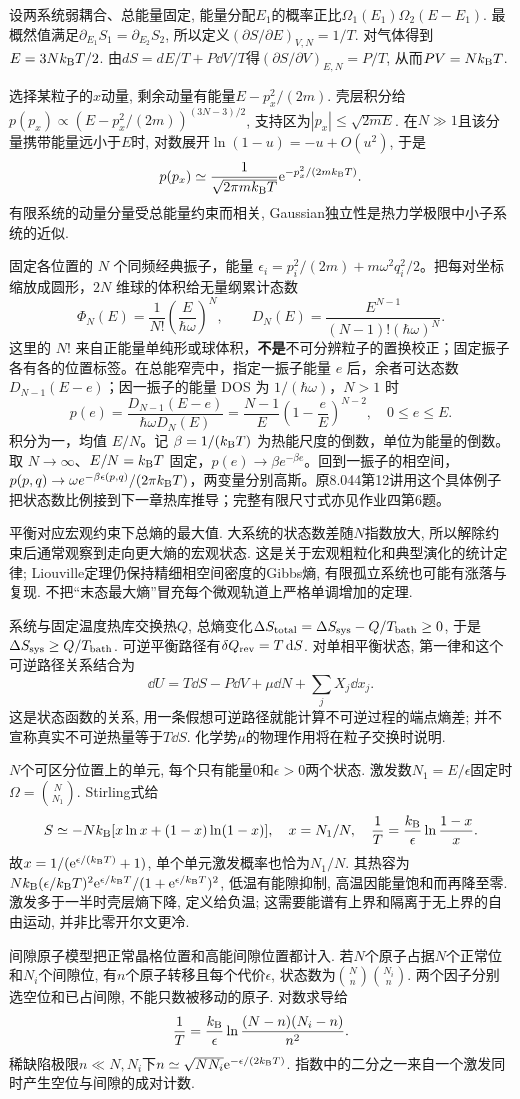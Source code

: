 设两系统弱耦合、总能量固定, 能量分配$E_1$的概率正比$\Omega_1(E_1)\Omega_2(E-E_1)$. 最概然值满足$\partial_{E_1}S_1=\partial_{E_2}S_2$, 所以定义$(\partial S/\partial E)_{V,N}=1/T$. 对气体得到$E=3Nk_{\mathrm B} T/2$. 由$dS=dE/T+P\dd V/T$得$(\partial S/\partial V)_{E,N}=P/T$, 从而$PV=Nk_{\mathrm B} T$.

选择某粒子的$x$动量, 剩余动量有能量$E-p_x^2/(2m)$. 壳层积分给$p(p_x)\propto(E-p_x^2/(2m))^{(3N-3)/2}$, 支持区为$|p_x|\le\sqrt{2mE}$. 在$N\gg1$且该分量携带能量远小于$E$时, 对数展开$\ln(1-u)=-u+O(u^2)$, 于是
\[
p(p_x)\simeq\frac1{\sqrt{2\pi mk_{\mathrm B} T}}\mathrm e^{-p_x^2/(2mk_{\mathrm B} T)}.
\]
有限系统的动量分量受总能量约束而相关, Gaussian独立性是热力学极限中小子系统的近似.

固定各位置的 $N$ 个同频经典振子，能量 $\epsilon_i=p_i^2/(2m)+m\omega^2q_i^2/2$。把每对坐标缩放成圆形，$2N$ 维球的体积给无量纲累计态数
\[\Phi_N(E)=\frac1{N!}\left(\frac E{\hbar\omega}\right)^N,\qquad D_N(E)=\frac{E^{N-1}}{(N-1)!(\hbar\omega)^N}.\]
这里的 $N!$ 来自正能量单纯形或球体积，\textbf{不是}不可分辨粒子的置换校正；固定振子各有各的位置标签。在总能窄壳中，指定一振子能量 $e$ 后，余者可达态数 $D_{N-1}(E-e)$；因一振子的能量 DOS 为 $1/(\hbar\omega)$，$N>1$ 时
\[p(e)=\frac{D_{N-1}(E-e)}{\hbar\omega D_N(E)}=\frac{N-1}E\left(1-\frac eE\right)^{N-2},\quad0\le e\le E.\]
积分为一，均值 $E/N$。记 $\beta=1/(k_{\mathrm B} T)$ 为热能尺度的倒数，单位为能量的倒数。取 $N\to\infty$、$E/N=k_{\mathrm B} T$ 固定，$p(e)\to\beta e^{-\beta e}$。回到一振子的相空间，$p(p,q)\to\omega e^{-\beta\epsilon(p,q)}/(2\pi k_{\mathrm B} T)$，两变量分别高斯。原8.044第12讲用这个具体例子把状态数比例接到下一章热库推导；完整有限尺寸式亦见作业四第6题。

平衡对应宏观约束下总熵的最大值. 大系统的状态数差随$N$指数放大, 所以解除约束后通常观察到走向更大熵的宏观状态. 这是关于宏观粗粒化和典型演化的统计定律; Liouville定理仍保持精细相空间密度的Gibbs熵, 有限孤立系统也可能有涨落与复现. 不把“末态最大熵”冒充每个微观轨道上严格单调增加的定理.

系统与固定温度热库交换热$Q$, 总熵变化$\Delta S_{\rm total}=\Delta S_{\rm sys}-Q/T_{\rm bath}\ge0$, 于是$\Delta S_{\rm sys}\ge Q/T_{\rm bath}$. 可逆平衡路径有$\delta Q_{\rm rev}=T\,\mathrm d S$. 对单相平衡状态, 第一律和这个可逆路径关系结合为
\[
\dd U=T\dd S-P\dd V+\mu\dd N+\sum_j X_j\dd x_j.
\]
这是状态函数的关系, 用一条假想可逆路径就能计算不可逆过程的端点熵差; 并不宣称真实不可逆热量等于$T\dd S$. 化学势$\mu$的物理作用将在粒子交换时说明.

$N$个可区分位置上的单元, 每个只有能量0和$\epsilon>0$两个状态. 激发数$N_1=E/\epsilon$固定时$\Omega=\binom N{N_1}$. Stirling式给
\[
S\simeq-Nk_{\mathrm B}[x\ln x+(1-x)\ln(1-x)],\quad x=N_1/N,
\quad\frac1T=\frac{k_{\mathrm B}}{\epsilon}\ln\frac{1-x}{x}.
\]
故$x=1/(\mathrm e^{\epsilon/(k_{\mathrm B} T)}+1)$, 单个单元激发概率也恰为$N_1/N$. 其热容为$Nk_{\mathrm B}(\epsilon/k_{\mathrm B} T)^2\mathrm e^{\epsilon/k_{\mathrm B} T}/(1+\mathrm e^{\epsilon/k_{\mathrm B} T})^2$, 低温有能隙抑制, 高温因能量饱和而再降至零. 激发多于一半时壳层熵下降, 定义给负温; 这需要能谱有上界和隔离于无上界的自由运动, 并非比零开尔文更冷.

间隙原子模型把正常晶格位置和高能间隙位置都计入. 若$N$个原子占据$N$个正常位和$N_i$个间隙位, 有$n$个原子转移且每个代价$\epsilon$, 状态数为$\binom Nn\binom{N_i}n$. 两个因子分别选空位和已占间隙, 不能只数被移动的原子. 对数求导给
\[
\frac1T=\frac{k_{\mathrm B}}{\epsilon}\ln\frac{(N-n)(N_i-n)}{n^2}.
\]
稀缺陷极限$n\ll N,N_i$下$n\simeq\sqrt{NN_i}\mathrm e^{-\epsilon/(2k_{\mathrm B} T)}$. 指数中的二分之一来自一个激发同时产生空位与间隙的成对计数.
